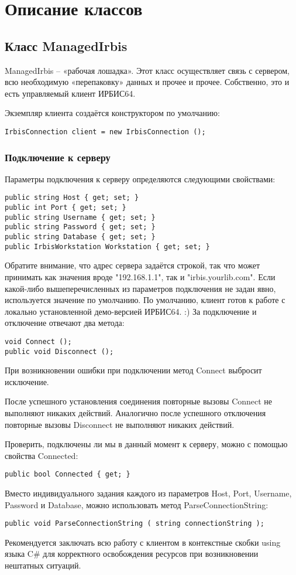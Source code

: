 \chapter{Описание классов}

\section{Класс ManagedIrbis}

ManagedIrbis – «рабочая лошадка». Этот класс осуществляет связь с сервером, всю необходимую «перепаковку» данных и прочее и прочее. Собственно, это и есть управляемый клиент ИРБИС64.

Экземпляр клиента создаётся конструктором по умолчанию:
\begin{lstlisting}
IrbisConnection client = new IrbisConnection ();
\end{lstlisting}

\subsection{Подключение к серверу}

Параметры подключения к серверу определяются следующими свойствами:

\begin{lstlisting}
public string Host { get; set; }
public int Port { get; set; }
public string Username { get; set; }
public string Password { get; set; }
public string Database { get; set; }
public IrbisWorkstation Workstation { get; set; }
\end{lstlisting}

Обратите внимание, что адрес сервера задаётся строкой, так что может принимать как значения вроде "192.168.1.1", так и "irbis.yourlib.com". 
Если какой-либо вышеперечисленных из параметров подключения не задан явно, используется значение по умолчанию. По умолчанию, клиент готов к работе с локально установленной демо-версией ИРБИС64. :) 
За подключение и отключение отвечают два метода: 
\begin{lstlisting}
void Connect ();
public void Disconnect ();
\end{lstlisting}
При возникновении ошибки при подключении метод Connect выбросит исключение. 

После успешного установления соединения повторные вызовы Connect не выполняют никаких действий. Аналогично после успешного отключения повторные вызовы Disconnect не выполняют никаких действий. 

Проверить, подключены ли мы в данный момент к серверу, можно с помощью свойства Connected:
\begin{lstlisting}
public bool Connected { get; }
\end{lstlisting} 
Вместо индивидуального задания каждого из параметров Host, Port, Username, Password и Database, можно использовать метод ParseConnectionString: 
\begin{lstlisting}
public void ParseConnectionString ( string connectionString );
\end{lstlisting}
Рекомендуется заключать всю работу с клиентом в контекстные скобки using языка C\# для корректного освобождения ресурсов при возникновении нештатных ситуаций. 

